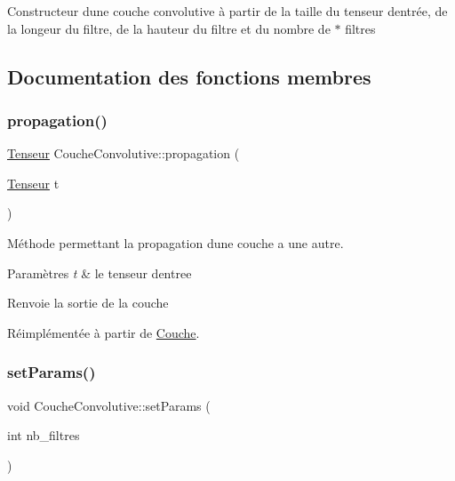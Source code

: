 Constructeur d\textquotesingle{}une couche convolutive à partir de la taille du tenseur d\textquotesingle{}entrée, de la longeur du filtre, de la hauteur du filtre et du nombre de $\ast$ filtres 

\subsection{Documentation des fonctions membres}
\mbox{\label{classCoucheConvolutive_ad1a55b3dc9bf52e0725ae2a7b2e92aa1}} 
\subsubsection{\texorpdfstring{propagation()}{propagation()}}
{\footnotesize\ttfamily \hyperlink{classTenseur}{Tenseur} Couche\+Convolutive\+::propagation (\begin{DoxyParamCaption}\item[{\hyperlink{classTenseur}{Tenseur}}]{t }\end{DoxyParamCaption})\hspace{0.3cm}{\ttfamily [virtual]}}



Méthode permettant la propagation d\textquotesingle{}une couche a une autre. 


\begin{DoxyParams}{Paramètres}
{\em t} & le tenseur d\textquotesingle{}entree \\
\hline
\end{DoxyParams}
\begin{DoxyReturn}{Renvoie}
la sortie de la couche 
\end{DoxyReturn}


Réimplémentée à partir de \hyperlink{classCouche_a1f0ed59e21020f5d4f37933af4d1b1e5}{Couche}.

\mbox{\label{classCoucheConvolutive_a30fd844fc3a96f2e90d1a20251b1bfe3}} 
\subsubsection{\texorpdfstring{set\+Params()}{setParams()}}
{\footnotesize\ttfamily void Couche\+Convolutive\+::set\+Params (\begin{DoxyParamCaption}\item[{int}]{nb\+\_\+filtres }\end{DoxyParamCaption})}



